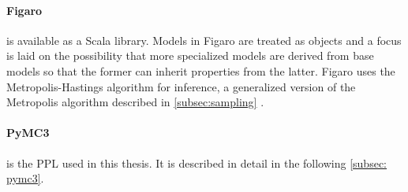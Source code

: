 \documentclass{article}
\begin{document}
\paragraph{Figaro}
is available as a Scala library. Models in Figaro are treated as objects and a focus is laid on the possibility that more specialized models are derived from base models so that the former can inherit properties from the latter. Figaro uses the Metropolis-Hastings algorithm for inference, a generalized version of the Metropolis algorithm described in \autoref{subsec:sampling} \cite{pfeffer2009figaro}.
\paragraph{PyMC3}
is the PPL used in this thesis. It is described in detail in the following \autoref{subsec: pymc3}.


\end{document}
